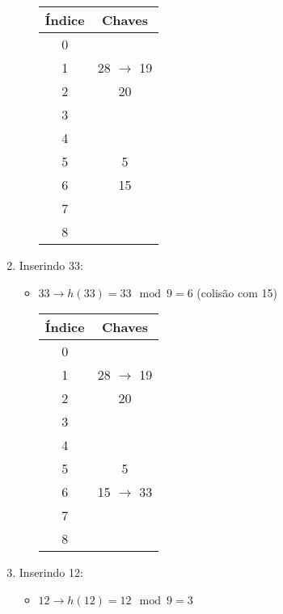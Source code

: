 \documentclass{article}
\begin{document}
\begin{enumerate}
\begin{itemize}
      \begin{center}
        \begin{tabular}{|c|c|}
        \hline
        \textbf{Índice} & \textbf{Chaves} \\
        \hline
        0 &  \\
        1 & 28 $\rightarrow$ 19\\
        2 & 20\\
        3 & \\
        4 &  \\
        5 & 5 \\
        6 & 15\\
        7 &  \\
        8 & \\
        \hline
        \end{tabular}
      \end{center}
    \end{itemize}
  \item Inserindo 33:
    \begin{itemize}
      \item \(33 \rightarrow h(33) = 33 \mod 9 = 6\) (colisão com 15)
          
      \begin{center}
        \begin{tabular}{|c|c|}
        \hline
        \textbf{Índice} & \textbf{Chaves} \\
        \hline
        0 &  \\
        1 & 28 $\rightarrow$ 19\\
        2 & 20\\
        3 & \\
        4 &  \\
        5 & 5 \\
        6 & 15 $\rightarrow$ 33\\
        7 &  \\
        8 & \\
        \hline
        \end{tabular}
      \end{center}
    \end{itemize}
  \item Inserindo 12:
    \begin{itemize}
      \item \(12 \rightarrow h(12) = 12 \mod 9 = 3\)
          

\end{itemize}
\end{enumerate}
\end{document}

